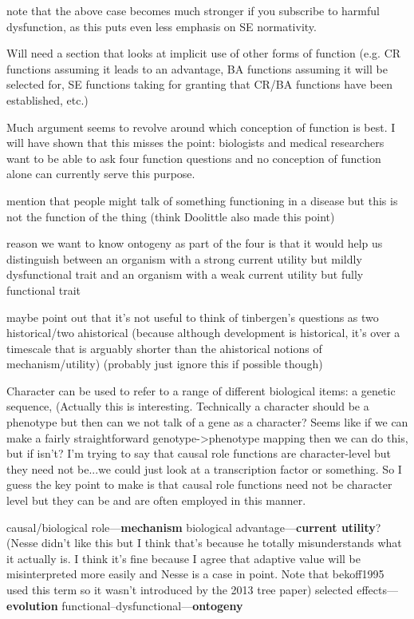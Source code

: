 \documentclass{article}
\begin{document}
note that the above case becomes much stronger if you subscribe to harmful dysfunction, as this puts even less emphasis on SE normativity.

Will need a section that looks at implicit use of other forms of function (e.g. CR functions assuming it leads to an advantage, BA functions assuming it will be selected for, SE functions taking for granting that CR/BA functions have been established, etc.)

Much argument seems to revolve around which conception of function is best. I will have shown that this misses the point: biologists and medical researchers want to be able to ask four function questions and no conception of function alone can currently serve this purpose.

mention that people might talk of something functioning in a disease but this is not the function of the thing (think Doolittle also made this point)

reason we want to know ontogeny as part of the four is that it would help us distinguish between an organism with a strong current utility but mildly dysfunctional trait and an organism with a weak current utility but fully functional trait

maybe point out that it's not useful to think of tinbergen's questions as two historical/two ahistorical (because although development is historical, it's over a timescale that is arguably shorter than the ahistorical notions of mechanism/utility) (probably just ignore this if possible though)

Character can be used to refer to a range of different biological items: a genetic sequence,
(Actually this is interesting. Technically a character should be a phenotype but then can we not talk of a gene as a character? Seems like if we can make a fairly straightforward genotype->phenotype mapping then we can do this, but if isn't? I'm trying to say that causal role functions are character-level but they need not be...we could just look at a transcription factor or something. So I guess the key point to make is that causal role functions need not be character level but they can be and are often employed in this manner.

causal/biological role---\textbf{mechanism}
biological advantage---\textbf{current utility}? (Nesse didn't like this but I think that's because he totally misunderstands what it actually is. I think it's fine because I agree that adaptive value will be misinterpreted more easily and Nesse is a case in point. Note that bekoff1995 used this term so it wasn't introduced by the 2013 tree paper)
selected effects---\textbf{evolution}
functional--dysfunctional---\textbf{ontogeny}
\end{document}
